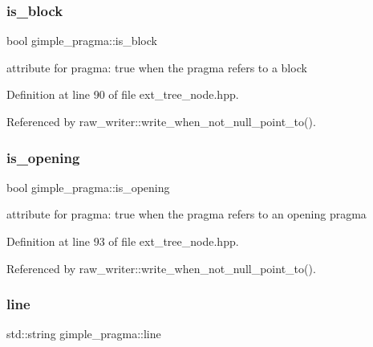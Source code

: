 \mbox{\label{structgimple__pragma_a4c12869ebdf5503feb31ef838c9d44e4}} 
\subsubsection{\texorpdfstring{is\+\_\+block}{is\_block}}
{\footnotesize\ttfamily bool gimple\+\_\+pragma\+::is\+\_\+block}



attribute for pragma\+: true when the pragma refers to a block 



Definition at line 90 of file ext\+\_\+tree\+\_\+node.\+hpp.



Referenced by raw\+\_\+writer\+::write\+\_\+when\+\_\+not\+\_\+null\+\_\+point\+\_\+to().

\mbox{\label{structgimple__pragma_ac64ace3a205adb470b3dfc5045a9f108}} 
\subsubsection{\texorpdfstring{is\+\_\+opening}{is\_opening}}
{\footnotesize\ttfamily bool gimple\+\_\+pragma\+::is\+\_\+opening}



attribute for pragma\+: true when the pragma refers to an opening pragma 



Definition at line 93 of file ext\+\_\+tree\+\_\+node.\+hpp.



Referenced by raw\+\_\+writer\+::write\+\_\+when\+\_\+not\+\_\+null\+\_\+point\+\_\+to().

\mbox{\label{structgimple__pragma_abe7cf41e8ef1815e3a1622a00a38efa1}} 
\subsubsection{\texorpdfstring{line}{line}}
{\footnotesize\ttfamily std\+::string gimple\+\_\+pragma\+::line}



